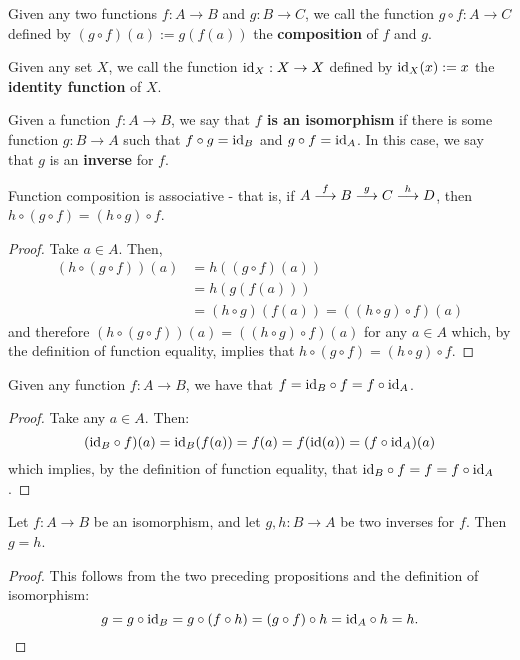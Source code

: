 \begin{df}
	Given any two functions $f:A\to B$ and $g:B\to C$, we call the function $g\circ f:A\to C$ defined by $(g\circ f)(a):=g(f(a))$ the \textbf{composition} of $f$ and $g$.
\end{df}

\begin{df}
	Given any set $X$, we call the function ${\rm id}_X:X\to X$ defined by ${\rm id}_X(x):=x$ the \textbf{identity function} of $X$.
\end{df}

\begin{df}
	Given a function $f:A\to B$, we say that \textbf{$f$ is an isomorphism} if there is some function $g:B\to A$ such that $f\circ g={\rm id}_B$ and $g\circ f={\rm id}_A$. In this case, we say that $g$ is an \textbf{inverse} for $f$.
\end{df}

\begin{prop}\label{prop: composition is associative}
	Function composition is associative - that is, if $A\stackrel{f}{\longrightarrow}B\stackrel{g}{\longrightarrow}C\stackrel{h}{\longrightarrow}D$, then $h\circ(g\circ f)=(h\circ g)\circ f$.
\end{prop}
\begin{proof}
	Take $a\in A$. Then,
	\begin{align*}
		(h\circ(g\circ f))(a)&=h((g\circ f)(a))\\
		&=h(g(f(a)))\\
		&=(h\circ g)(f(a))=((h\circ g)\circ f)(a)
	\end{align*}and therefore $(h\circ(g\circ f))(a)=((h\circ g)\circ f)(a)$ for any $a\in A$ which, by the definition of function equality, implies that $h\circ(g\circ f)=(h\circ g)\circ f$.
\end{proof}

\begin{prop}
	Given any function $f:A\to B$, we have that $f={\rm id}_B\circ f=f\circ{\rm id}_A$.
\end{prop}
\begin{proof}
	Take any $a\in A$. Then:
	\[({\rm id}_B\circ f)(a)={\rm id}_B(f(a))=f(a)=f({\rm id}(a))=(f\circ{\rm id}_A)(a)\]which implies, by the definition of function equality, that ${\rm id}_B\circ f=f=f\circ {\rm id}_A$.
\end{proof}

\begin{prop}
	Let $f:A\to B$ be an isomorphism, and let $g,h:B\to A$ be two inverses for $f$. Then $g=h$.
\end{prop}
\begin{proof}
	This follows from the two preceding propositions and the definition of isomorphism:
	\[g=g\circ{\rm id}_B=g\circ(f\circ h)=(g\circ f)\circ h={\rm id}_A\circ h=h.\]
\end{proof}

